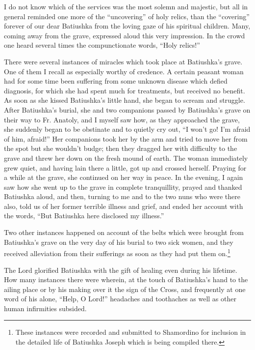 I do not know which of the services was the most solemn and majestic, but all in general reminded one more of the ``uncovering'' of holy relics, than the ``covering'' forever of our dear Batiushka from the loving gaze of his spiritual children. Many, coming away from the grave, expressed aloud this very impression. In the crowd one heard several times the compunctionate words, ``Holy relics!''

There were several instances of miracles which took place at Batiushka's grave. One of them I recall as especially worthy of credence. A certain peasant woman had for some time been suffering from some unknown disease which defied diagnosis, for which she had spent much for treatments, but received no benefit. As soon as she kissed Batiushka's little hand, she began to scream and struggle. After Batiushka's burial, she and two companions passed by Batiushka's grave on their way to Fr. Anatoly, and I myself saw how, as they approached the grave, she suddenly began to be obstinate and to quietly cry out, ``I won't go! I'm afraid of him, afraid!'' Her companions took her by the arm and tried to move her from the spot but she wouldn't budge; then they dragged her with difficulty to the grave and threw her down on the fresh mound of earth. The woman immediately grew quiet, and having lain there a little, got up and crossed herself. Praying for a while at the grave, she continued on her way in peace. In the evening, I again saw how she went up to the grave in complete tranquillity, prayed and thanked Batiushka aloud, and then, turning to me and to the two nuns who were there also, told us of her former terrible illness and grief, and ended her account with the words, ``But Batiushka here disclosed my illness.''

Two other instances happened on account of the belts which were brought from Batiushka's grave on the very day of his burial to two sick women, and they received alleviation from their sufferings as soon as they had put them on.\footnote{These instances were recorded and submitted to Shamordino for inclusion in the detailed life of Batiushka Joseph which is being compiled there.}

The Lord glorified Batiushka with the gift of healing even during his lifetime. How many instances there were wherein, at the touch of Batiushka's hand to the ailing place or by his making over it the sign of the Cross, and frequently at one word of his alone, ``Help, O Lord!'' headaches and toothaches as well as other human infirmities subsided.

